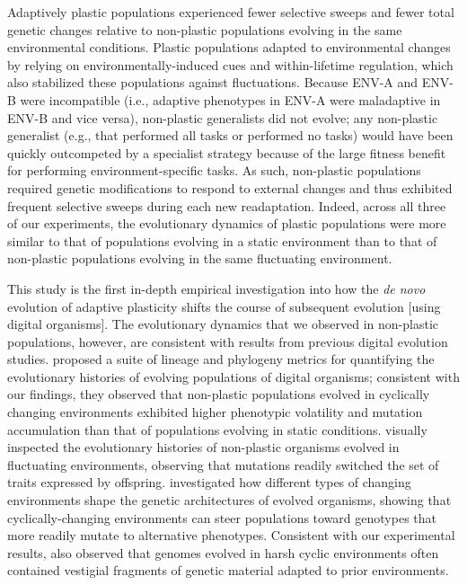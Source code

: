 Adaptively plastic populations experienced fewer selective sweeps and fewer total genetic changes relative to non-plastic populations evolving in the same environmental conditions.
Plastic populations adapted to environmental changes by relying on environmentally-induced cues and within-lifetime regulation, which also stabilized these populations against fluctuations. 
Because ENV-A and ENV-B were incompatible (i.e., adaptive phenotypes in ENV-A were maladaptive in ENV-B and vice versa), non-plastic generalists did not evolve; any non-plastic generalist (e.g., that performed all tasks or performed no tasks) would have been quickly outcompeted by a specialist strategy because of the large fitness benefit for performing environment-specific tasks.
As such, non-plastic populations required genetic modifications to respond to external changes and thus exhibited frequent selective sweeps during each new readaptation.
Indeed, across all three of our experiments, the evolutionary dynamics of plastic populations were more similar to that of populations evolving in a static environment than to that of non-plastic populations evolving in the same fluctuating environment.


This study is the first in-depth empirical investigation into how the \textit{de novo} evolution of adaptive plasticity shifts the course of subsequent evolution [using digital organisms].
The evolutionary dynamics that we observed in non-plastic populations, however, are consistent with results from previous digital evolution studies. %
\cite{dolson_interpreting_2020} proposed a suite of lineage and phylogeny metrics for quantifying the evolutionary histories of evolving populations of digital organisms; consistent with our findings, they observed that non-plastic populations evolved in cyclically changing environments exhibited higher phenotypic volatility and mutation accumulation than that of populations evolving in static conditions.
\cite{lalejini_evolutionary_2016} visually inspected the evolutionary histories of non-plastic organisms evolved in fluctuating environments, observing that mutations readily switched the set of traits expressed by offspring.
\cite{canino-koning_evolution_2016} investigated how different types of changing environments shape the genetic architectures of evolved organisms, showing that cyclically-changing environments can steer populations toward genotypes that more readily mutate to alternative phenotypes.
Consistent with our experimental results, \cite{canino-koning_evolution_2016} also observed that genomes evolved in harsh cyclic environments often contained vestigial fragments of genetic material adapted to prior environments.


